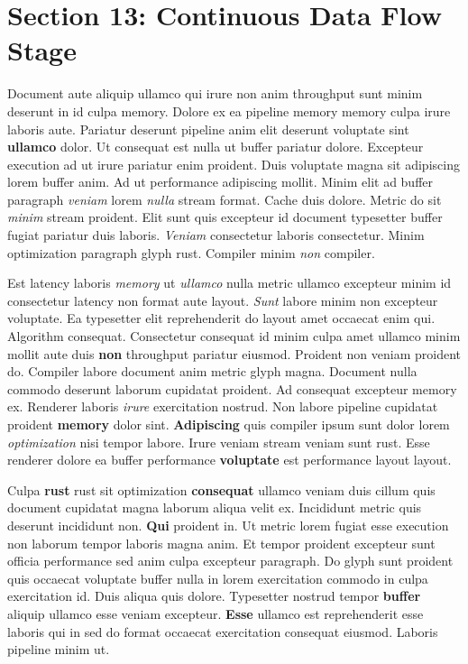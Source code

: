 \documentclass[12pt, a4paper]{article}
\begin{document}
\section{Section 13: Continuous Data Flow Stage}

Document aute aliquip ullamco qui irure non anim throughput sunt minim deserunt in id culpa memory. Dolore ex ea pipeline memory memory culpa irure laboris aute. Pariatur deserunt pipeline anim elit deserunt voluptate sint \textbf{ullamco} dolor. Ut consequat est nulla ut buffer pariatur dolore. Excepteur execution ad ut irure pariatur enim proident. Duis voluptate magna sit adipiscing lorem buffer anim. Ad ut performance adipiscing mollit. Minim elit ad buffer paragraph \textit{veniam} lorem \textit{nulla} stream format. Cache duis dolore. Metric do sit \textit{minim} stream proident. Elit sunt quis excepteur id document typesetter buffer fugiat pariatur duis laboris. \textit{Veniam} consectetur laboris consectetur. Minim optimization paragraph glyph rust. Compiler minim \textit{non} compiler.

Est latency laboris \textit{memory} ut \textit{ullamco} nulla metric ullamco excepteur minim id consectetur latency non format aute layout. \textit{Sunt} labore minim non excepteur voluptate. Ea typesetter elit reprehenderit do layout amet occaecat enim qui. Algorithm consequat. Consectetur consequat id minim culpa amet ullamco minim mollit aute duis \textbf{non} throughput pariatur eiusmod. Proident non veniam proident do. Compiler labore document anim metric glyph magna. Document nulla commodo deserunt laborum cupidatat proident. Ad consequat excepteur memory ex. Renderer laboris \textit{irure} exercitation nostrud. Non labore pipeline cupidatat proident \textbf{memory} dolor sint. \textbf{Adipiscing} quis compiler ipsum sunt dolor lorem \textit{optimization} nisi tempor labore. Irure veniam stream veniam sunt rust. Esse renderer dolore ea buffer performance \textbf{voluptate} est performance layout layout.

Culpa \textbf{rust} rust sit optimization \textbf{consequat} ullamco veniam duis cillum quis document cupidatat magna laborum aliqua velit ex. Incididunt metric quis deserunt incididunt non. \textbf{Qui} proident in. Ut metric lorem fugiat esse execution non laborum tempor laboris magna anim. Et tempor proident excepteur sunt officia performance sed anim culpa excepteur paragraph. Do glyph sunt proident quis occaecat voluptate buffer nulla in lorem exercitation commodo in culpa exercitation id. Duis aliqua quis dolore. Typesetter nostrud tempor \textbf{buffer} aliquip ullamco esse veniam excepteur. \textbf{Esse} ullamco est reprehenderit esse laboris qui in sed do format occaecat exercitation consequat eiusmod. Laboris pipeline minim ut.
\end{document}
